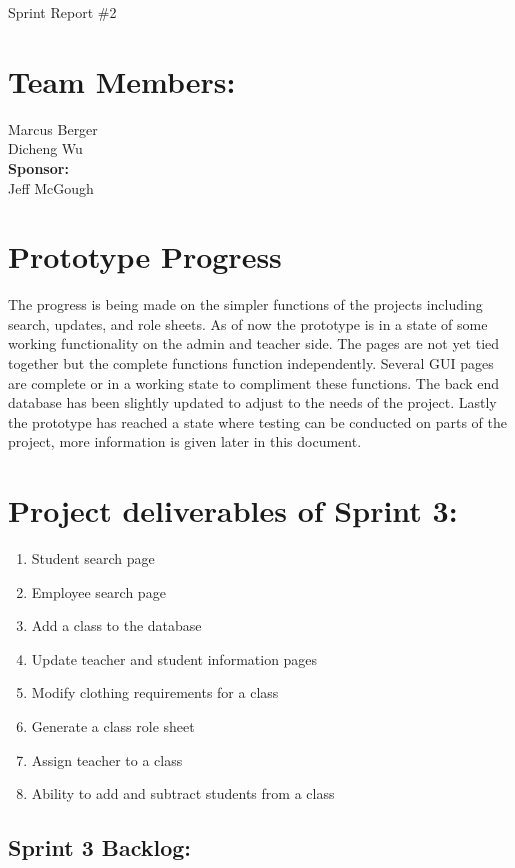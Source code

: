 \documentclass[11pt]{book}
\begin{document}
\fontsize{16}{16}\selectfont Sprint Report \#2


\section{Team Members:}
Marcus Berger
\\Dicheng Wu\\
\textbf{Sponsor:}
\\Jeff McGough
\\

\section{Prototype Progress}
The progress is being made on the simpler functions of the projects including search, updates, and role sheets. As of now the prototype is in a state of some working functionality on the admin and teacher side. The pages are not yet tied together but the complete functions function independently. Several GUI pages are complete or in a working state to compliment these functions. The back end database has been slightly updated to adjust to the needs of the project. Lastly the prototype has reached a state where testing can be conducted on parts of the project, more information is given later in this document.

\section{Project deliverables of Sprint 3:}

\begin{enumerate}
\item Student search page 
\item Employee search page
\item Add a class to the database
\item Update teacher and student information pages
\item Modify clothing requirements for a class
\item Generate a class role sheet
\item Assign teacher to a class
\item Ability to add and subtract students from a class  
\end{enumerate}


\subsection{Sprint 3 Backlog:}
\end{document}
